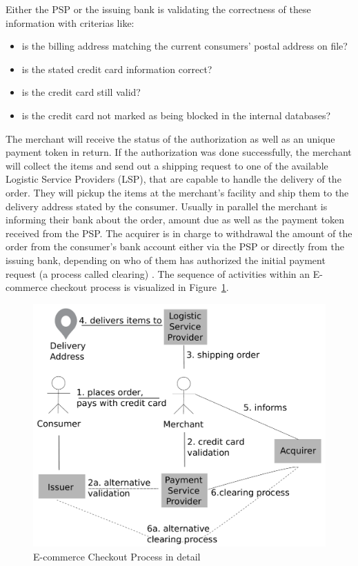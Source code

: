 Either the \gls{PSP} or the issuing bank is validating the correctness of these information with criterias like: \@

\begin{itemize}
    \item is the billing address matching the current consumers' postal address on file?
    \item is the stated credit card information correct?
    \item is the credit card still valid?
    \item is the credit card not marked as being blocked in the internal databases?
\end{itemize}

The merchant will receive the status of the authorization as well as an unique payment token in return. If the authorization was done successfully, the merchant will collect the items and send out a shipping request to one of the available Logistic Service Providers (\gls{LSP}), that are capable to handle the delivery of the order. They will pickup the items at the merchant's facility and ship them to the delivery address stated by the consumer. Usually in parallel the merchant is informing their bank about the order, amount due as well as the payment token received from the \gls{PSP}. The acquirer is in charge to withdrawal the amount of the order from the consumer's bank account either via the \gls{PSP} or directly from the issuing bank, depending on who of them has authorized the initial payment request (a process called clearing) \citep{VisaPayment2014}. The sequence of activities within an E-commerce checkout process is visualized in Figure~\ref{fig:images_ecommerce_checkout_process}.\@

\begin{figure}[H]
	\centering
		\includegraphics[width=0.8\columnwidth]{images/e-commerce-checkout-process.pdf}
	\caption{E-commerce Checkout Process in detail}
\label{fig:images_ecommerce_checkout_process}
\end{figure}

